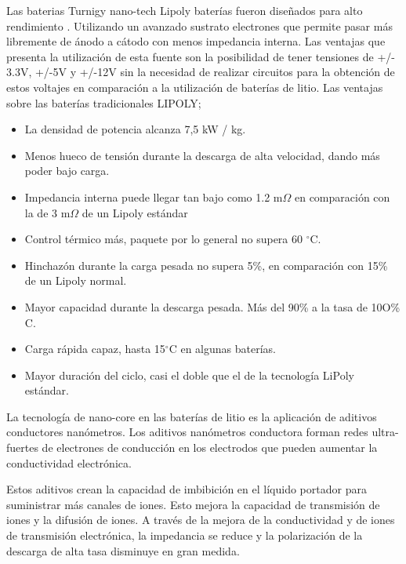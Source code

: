 Las baterias Turnigy nano-tech Lipoly bater\'ias fueron dise\~nados para alto rendimiento . Utilizando un avanzado sustrato electrones que permite pasar m\'as libremente de \'anodo a c\'atodo con menos impedancia interna.
 Las ventajas que presenta la utilización de esta fuente son la posibilidad de tener tensiones de +/- 3.3V, +/-5V y +/-12V sin la necesidad de realizar circuitos para la obtención de estos voltajes en comparación a la utilización de baterías de litio.
 \newline
 \hfill
Las ventajas sobre las bater\'ias tradicionales LIPOLY;
\begin{itemize}
    \item La densidad de potencia alcanza 7,5 kW / kg.
    \item Menos hueco de tensi\'on durante la descarga de alta velocidad, dando m\'as poder bajo carga.
    \item Impedancia interna puede llegar tan bajo como 1.2 m${\Omega }$ en comparación con la de 3 m${\Omega }$ de un Lipoly estándar
    \item Control t\'ermico m\'as, paquete por lo general no supera 60 $^{\circ}$C.
    \item Hinchazón durante la carga pesada no supera 5\%, en comparación con 15\% de un Lipoly normal.
    \item Mayor capacidad durante la descarga pesada. M\'as del 90\% a la tasa de 10O\% C.
    \item Carga r\'apida capaz, hasta 15$^{\circ}$C en algunas baterías.
    \item Mayor duraci\'on del ciclo, casi el doble que el de la tecnolog\'ia LiPoly est\'andar.
\end{itemize}


La tecnolog\'ia de nano-core en las bater\'ias de litio es la aplicaci\'on de aditivos conductores nan\'ometros. Los aditivos nan\'ometros conductora forman redes ultra-fuertes de electrones de conducci\'on en los electrodos que pueden aumentar la conductividad electr\'onica.

Estos aditivos crean la capacidad de imbibici\'on en el l\'iquido portador para suministrar m\'as canales de iones. Esto mejora la capacidad de transmisi\'on de iones y la difusi\'on de iones. A trav\'es de la mejora de la conductividad y de iones de transmisi\'on electr\'onica, la impedancia se reduce y la polarizaci\'on de la descarga de alta tasa disminuye en gran medida.

